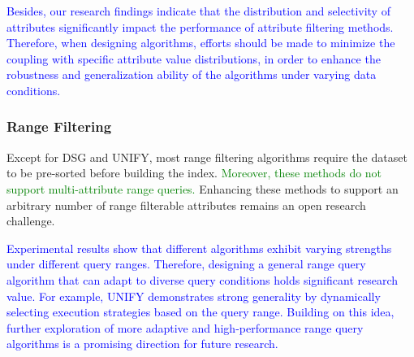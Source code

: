 \documentclass[sigconf, nonacm]{acmart}
\begin{document}
{		
	\textcolor{blue}{
	Besides, our research findings indicate that the distribution and selectivity of attributes significantly impact the performance of attribute filtering methods. Therefore, when designing algorithms, efforts should be made to minimize the coupling with specific attribute value distributions, in order to enhance the robustness and generalization ability of the algorithms under varying data conditions.}
	
	
	\subsubsection{Range Filtering}
	
	Except for DSG and UNIFY, most range filtering algorithms require the dataset to be pre-sorted before building the index. \textcolor{green}{Moreover, these methods do not support multi-attribute range queries. }Enhancing these methods to support an arbitrary number of range filterable attributes remains an open research challenge.
	

\textcolor{blue}{
Experimental results show that different algorithms exhibit varying strengths under different query ranges. Therefore, designing a general range query algorithm that can adapt to diverse query conditions holds significant research value. For example, UNIFY demonstrates strong generality by dynamically selecting execution strategies based on the query range. Building on this idea, further exploration of more adaptive and high-performance range query algorithms is a promising direction for future research.}
	
}
\end{document}
